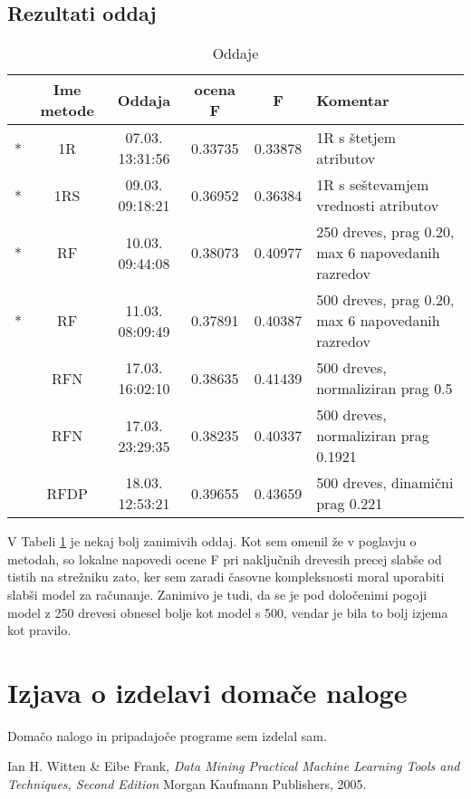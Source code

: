 \documentclass[a4paper,11pt]{article}
\begin{document}
\subsection{Rezultati oddaj}
\begin{table}[H]
\caption{Oddaje}
\begin{tabular}{ c | c | c | c | c | p{6cm} }
  & Ime metode & Oddaja & ocena F &  F & Komentar\\
  \hline \hline
  * & 1R & 07.03. 13:31:56 & 0.33735 & 0.33878 & 1R s štetjem atributov \\ \hline
  * & 1RS &09.03. 09:18:21 & 0.36952 & 0.36384 & 1R s seštevamjem vrednosti atributov \\\hline
  * & RF &10.03. 09:44:08 & 0.38073 & 0.40977 & 250 dreves, prag 0.20, max 6 napovedanih razredov \\ \hline
  * & RF &11.03. 08:09:49 & 0.37891 & 0.40387 & 500 dreves, prag 0.20, max 6 napovedanih razredov \\ \hline
  & RFN &17.03. 16:02:10 & 0.38635 & 0.41439 & 500 dreves, normaliziran prag 0.5 \\ 
\hline
  & RFN &17.03. 23:29:35 & 0.38235 & 0.40337 & 500 dreves, normaliziran prag 0.1921 \\ \hline

  & RFDP &18.03. 12:53:21 & 0.39655 & 0.43659 & 500 dreves, dinamični prag 0.221 \\ 


 
 
 \end{tabular}
 \label{tabela}
\end{table}
V Tabeli \ref{tabela} je nekaj bolj zanimivih oddaj. Kot sem omenil že v poglavju o metodah, so lokalne napovedi ocene F pri naključnih drevesih precej slabše od tistih na strežniku zato, ker sem zaradi časovne kompleksnosti moral uporabiti slabši model za računanje. Zanimivo je tudi, da se je pod določenimi pogoji model z 250 drevesi obnesel bolje kot model s 500, vendar je bila to bolj izjema kot pravilo.

\section{Izjava o izdelavi domače naloge}
Domačo nalogo in pripadajoče programe sem izdelal sam.


\begin{thebibliography}{9}

   Ian H. Witten \& Eibe Frank,
   \emph{Data Mining Practical Machine Learning Tools and Techniques, Second Edition}
   Morgan Kaufmann Publishers,  
   2005.

\end{thebibliography}
\end{document}
